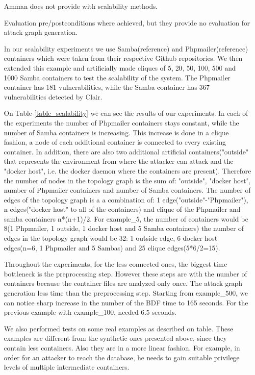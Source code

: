 \documentclass[letterpaper, 10 pt, conference]{ieeeconf}  %
\begin{document}
Amman does not provide with scalability methods.

Evaluation pre/postconditions where achieved, but they provide no evaluation for attack graph generation.


In our scalability experiments we use Samba(reference) and Phpmailer(reference) containers which were taken from their respective Github repositories. We then extended this example and artificially made cliques of 5, 20, 50, 100, 500 and 1000 Samba containers to test the scalability of the system. The Phpmailer container has 181 vulnerabilities, while the Samba container has 367 vulnerabilities detected by Clair.

On Table \ref{table_scalability} we can see the results of our experiments. In each of the experiments the number of Phpmailer containers stays constant, while the number of Samba containers is increasing. This increase is done in a clique fashion, a node of each additional container is connected to every existing container. In addition, there are also two additional artificial containers("outside" that represents the environment from where the attacker can attack and the "docker host", i.e. the docker daemon where the containers are present). Therefore the number of nodes in the topology graph is the sum of: "outside", "docker host", number of Phpmailer containers and number of Samba containers. The number of edges of the topology graph is a a combination of: 1 edge("outside"-"Phpmailer"), n edges("docker host" to all of the containers) and clique of the Phpmailer and samba containers n*(n+1)/2. For example\_5, the number of containers would be 8(1 Phpmailer, 1 outside, 1 docker host and 5 Samba containers) the number of edges in the topology graph would be 32: 1 outside edge, 6 docker host edges(n=6, 1 Phpmailer and 5 Sambas) and 25 clique edges(5*6/2=15).

Throughout the experiments, for the less connected ones, the biggest time bottleneck is the preprocessing step. However these steps are with the number of containers because the container files are analyzed only once. The attack graph generation less time than the preprocessing step. Starting from example\_500, we can notice sharp increase in the number of the BDF time to 165 seconds. For the previous example with example\_100, needed 6.5 seconds.

We also performed tests on some real examples as described on table. These examples are different from the synthetic ones presented above, since they contain less containers. Also they are in a more linear fashion. For example, in order for an attacker to reach the database, he needs to gain suitable privilege levels of multiple intermediate containers. 
\end{document}
